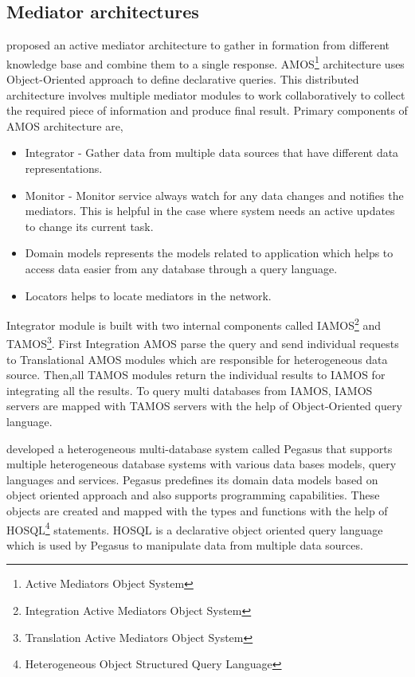 \documentclass[12pt]{article}
\begin{document}
\subsection{Mediator architectures}
\citet{fahl1993amos} proposed an active mediator architecture to gather in
formation from different knowledge base and combine them to a single response. AMOS\footnote{\label{amos}Active Mediators Object System} architecture uses Object-Oriented approach to define declarative queries. This distributed architecture involves multiple mediator modules to work collaboratively to collect the required piece of information and produce final result. Primary components of AMOS architecture are,
\begin{itemize}
	\item Integrator - Gather data from multiple data sources that have different data representations.
	\item Monitor - Monitor service always watch for any data changes and notifies the mediators. This is helpful in the case where system needs an active updates to change its current task.
	\item Domain models represents the models related to application which helps to access data easier from any database through a query language.
	\item Locators helps to locate mediators in the network.
\end{itemize}


Integrator module is built with two internal components called IAMOS\footnote{\label{amos}Integration Active Mediators Object System} and TAMOS\footnote{\label{amos}Translation Active Mediators Object System}. 
First Integration AMOS parse the query and send individual requests to Translational AMOS modules which are responsible for heterogeneous data source.
Then,all TAMOS modules return the individual results to IAMOS for integrating all the results. To query multi databases from IAMOS, IAMOS servers are mapped with TAMOS servers with the help of Object-Oriented query language.


\citet{ahmed1991pegasus} developed a heterogeneous multi-database system called Pegasus that supports multiple heterogeneous database systems with various data bases models, query languages and services. Pegasus predefines its domain data models based on object oriented approach and also supports programming capabilities. These objects are created and mapped with the types and functions with the help of HOSQL\footnote{\label{myfootnote}Heterogeneous Object Structured Query Language} statements. HOSQL is a declarative object oriented query language which is used by Pegasus to manipulate data from multiple data sources.
\end{document}
